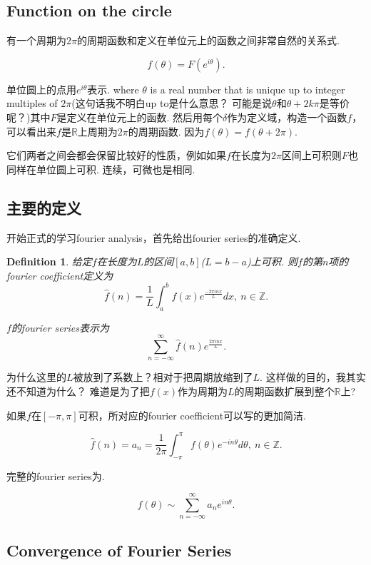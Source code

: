 \documentclass{article}
\newtheorem{definition}[theorem]{Definition}
\begin{document}
\subsection{Function on the circle}

有一个周期为$2\pi$的周期函数和定义在单位元上的函数之间非常自然的关系式.

$$
f(\theta) = F(e^{i\theta}).
$$

单位圆上的点用$e^{i\theta}$表示. where $\theta$ is a real number
that is unique up to integer multiples of $2\pi$(这句话我不明白up to是什么意思？ 可能是说$\theta$和$\theta + 2k\pi$是等价呢？)其中$F$是定义在单位元上的函数. 然后用每个$\delta$作为定义域，构造一个函数$f$，可以看出来$f$是$\mathbb{R}$上周期为$2\pi$的周期函数. 因为$f(\theta) = f(\theta + 2\pi).$

它们两者之间会都会保留比较好的性质，例如如果$f$在长度为$2\pi$区间上可积则$F$也同样在单位圆上可积. 连续，可微也是相同.

\subsection{主要的定义}
开始正式的学习fourier analysis，首先给出fourier series的准确定义. 

\begin{definition}
\rm 给定$f$在长度为$L$的区间$[a,b]$($L=b-a$)上可积. 则$f$的第$n$项的fourier coefficient定义为
$$
	\widehat{f}(n) = \frac{1}{L} \int_{a}^{b} f(x)e^\frac{{-2\pi inx}}{L}dx, \ n \in \mathbb{Z}.
$$

$f$的fourier series表示为
$$
\sum\limits_{n=-\infty}^{\infty} \widehat{f}(n)e^{\frac{2\pi inx}{L}}.
$$
\end{definition}

为什么这里的$L$被放到了系数上？相对于把周期放缩到了$L$. 这样做的目的，我其实还不知道为什么？ 难道是为了把$f(x)$作为周期为$L$的周期函数扩展到整个$\mathbb{R}$上?

如果$f$在$[-\pi,\pi]$可积，所对应的fourier coefficient可以写的更加简洁.

$$
	\widehat{f}(n) = a_n = \frac{1}{2\pi} \int_{-\pi}^{\pi} f(\theta)e^{-in\theta}d\theta, \ n \in \mathbb{Z}.
$$

完整的fourier series为.

$$
f(\theta) \sim \sum\limits_{n=-\infty}^{\infty} a_n e^{in\theta}.
$$

\subsection{Convergence of Fourier Series}
 
\end{document}

